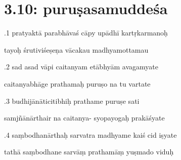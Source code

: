\documentclass[article,12pt,a4paper]{memoir}%
\newcounter{parCount}
\begin{document}
	  
	
\chapter[{3.10: puruṣasamuddeśa}][{3.10: puruṣasamuddeśa}]{ 3.10: puruṣasamuddeśa}

	  
	  \pstart {}.1 pratyaktā parabhāvaś cāpy upādhī kartṛkarmanoḥ 
	{}
	\pend%
      

	  
	  \pstart \leavevmode%
	tayoḥ śrutiviśeṣeṇa vācakau madhyamottamau 
	{}
	\pend%
      

	  
	  \pstart {}.2 sad asad vāpi caitanyam etābhyām avagamyate 
	{}
	\pend%
      

	  
	  \pstart \leavevmode%
	caitanyabhāge prathamaḥ puruṣo na tu vartate 
	{}
	\pend%
      

	  
	  \pstart {}.3 budhijānāticitibhiḥ prathame puruṣe sati 
	{}
	\pend%
      

	  
	  \pstart \leavevmode%
	samjñānārthair na caitanya- syopayogaḥ prakāśyate 
	{}
	\pend%
      

	  
	  \pstart {}.4 saṃbodhanārthaḥ sarvatra madhyame kaiś cid iṣyate 
	{}
	\pend%
      

	  
	  \pstart \leavevmode%
	tathā saṃbodhane sarvāṃ prathamāṃ yuṣmado viduḥ 
	{}
	\pend%
      
\end{document}
